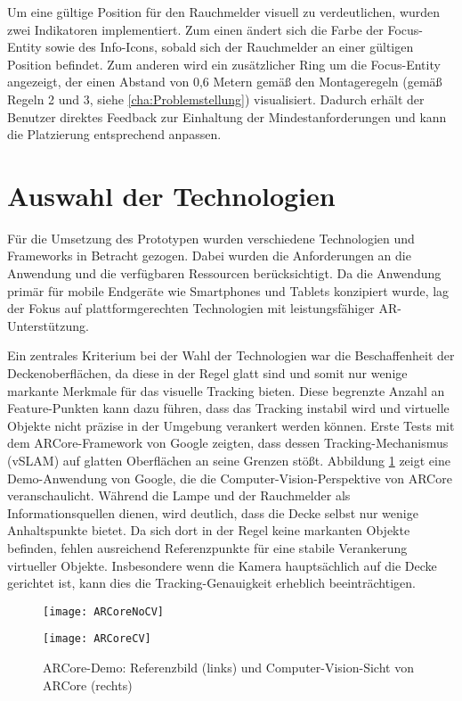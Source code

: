 Um eine gültige Position für den Rauchmelder visuell zu verdeutlichen, wurden zwei Indikatoren implementiert. Zum einen ändert sich die Farbe der Focus-Entity sowie des Info-Icons, sobald sich der Rauchmelder an einer gültigen Position befindet. Zum anderen wird ein zusätzlicher Ring um die Focus-Entity angezeigt, der einen Abstand von 0,6 Metern gemäß den Montageregeln (gemäß Regeln 2 und 3, siehe \ref{cha:Problemstellung}) visualisiert. Dadurch erhält der Benutzer direktes Feedback zur Einhaltung der Mindestanforderungen und kann die Platzierung entsprechend anpassen.

\section{Auswahl der Technologien}

Für die Umsetzung des Prototypen wurden verschiedene Technologien und Frameworks in Betracht gezogen. Dabei wurden die Anforderungen an die Anwendung und die verfügbaren Ressourcen berücksichtigt. Da die Anwendung primär für mobile Endgeräte wie Smartphones und Tablets konzipiert wurde, lag der Fokus auf plattformgerechten Technologien mit leistungsfähiger AR-Unterstützung.

Ein zentrales Kriterium bei der Wahl der Technologien war die Beschaffenheit der Deckenoberflächen, da diese in der Regel glatt sind und somit nur wenige markante Merkmale für das visuelle Tracking bieten. Diese begrenzte Anzahl an Feature-Punkten kann dazu führen, dass das Tracking instabil wird und virtuelle Objekte nicht präzise in der Umgebung verankert werden können. Erste Tests mit dem ARCore-Framework von Google zeigten, dass dessen Tracking-Mechanismus (vSLAM) auf glatten Oberflächen an seine Grenzen stößt. Abbildung \ref{fig:ARCore} zeigt eine Demo-Anwendung von Google, die die Computer-Vision-Perspektive von ARCore veranschaulicht. Während die Lampe und der Rauchmelder als Informationsquellen dienen, wird deutlich, dass die Decke selbst nur wenige Anhaltspunkte bietet. Da sich dort in der Regel keine markanten Objekte befinden, fehlen ausreichend Referenzpunkte für eine stabile Verankerung virtueller Objekte. Insbesondere wenn die Kamera hauptsächlich auf die Decke gerichtet ist, kann dies die Tracking-Genauigkeit erheblich beeinträchtigen.

\begin{figure}[ht]
    \centering
    \begin{minipage}{0.45\textwidth}
        \centering
        \texttt{[image: ARCoreNoCV]}
    \end{minipage}
    \hfill
    \begin{minipage}{0.45\textwidth}
        \centering
        \texttt{[image: ARCoreCV]}
    \end{minipage}
    \caption{ARCore-Demo: Referenzbild (links) und Computer-Vision-Sicht von ARCore (rechts)}
    \label{fig:ARCore}
\end{figure}

